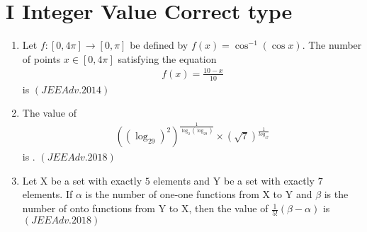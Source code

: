 \documentclass[journal,12pt,twocolumn,article]{IEEEtran}
\theoremstyle{remark}
\begin{document}
	    \section*{I Integer Value Correct type}
		   \begin{enumerate}
			   \item Let $f:[0,4\pi]\to[0,\pi]$ be defined by $f(x)=\cos^{-1}(\cos x)$. The number of points $x\in[0,4\pi]$ satisfying the equation 
				   \begin{align*}
					   {f(x)=\frac{10-x}{10}}
				   \end{align*}
				   is \hfill${(JEE Adv.2014)}$
			   \item The  value  of  
				   \begin{align*}((\log_29)^2)^{\frac{1}{\log_2(\log_29)}}\times (\sqrt7)^{\frac{1}{log_47}}
				   \end{align*}
				   is .
				   \hfill${(JEEAdv.2018)}$
			   \item Let X be a set with exactly $5$ elements and Y be a set with exactly $7$ elements. If $\alpha$ is the number of one-one functions from X to Y and $\beta$ is the number of onto functions from Y to X, then the value of $\frac{1}{5!}(\beta-\alpha)$ is ${(JEEAdv.2018)}$
		   \end{enumerate}
\end{document}
